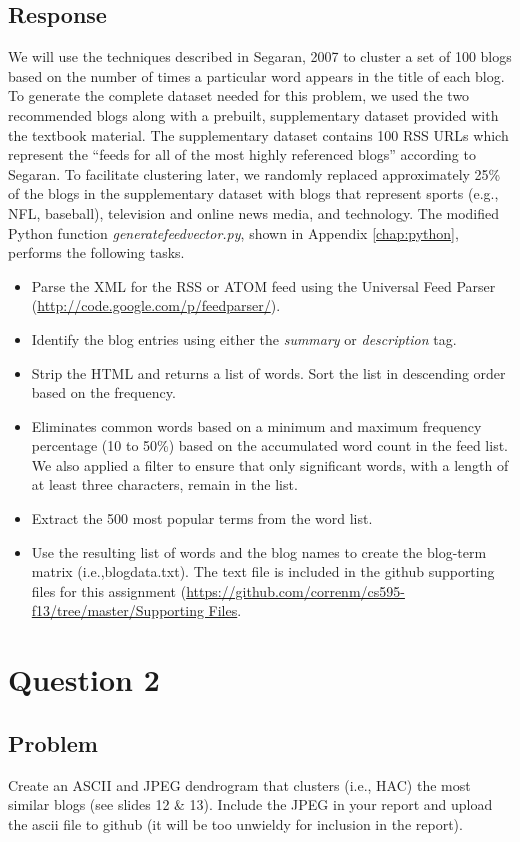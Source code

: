 \documentclass[letterpaper,11pt]{report}
\begin{document}
\begin{savenotes}
\subsection{Response}We will use the techniques described in Segaran, 2007 \cite{segaran2007programming} to cluster a set of 100 blogs based on the number of times a particular word appears in the title of each blog. To generate the complete dataset needed for this problem, we used the two recommended blogs along with a prebuilt, supplementary dataset provided with the textbook material. The supplementary dataset contains 100 RSS URLs which represent the ``feeds for all of the most highly referenced blogs'' according to Segaran. To facilitate clustering later, we randomly replaced approximately 25\% of the blogs in the supplementary dataset with blogs that represent sports (e.g., NFL, baseball), television and online news media, and technology. The modified Python function \emph{generatefeedvector.py}, shown in Appendix \ref{chap:python}, performs the following tasks.
\begin{itemize}
\item Parse the XML for the RSS or ATOM feed using the Universal Feed Parser (\url{http://code.google.com/p/feedparser/}).
\item Identify the blog entries using either the \emph{summary} or \emph{description} tag.
\item Strip the HTML and returns a list of words. Sort the list in descending order based on the frequency.
\item Eliminates common words based on a minimum and maximum frequency percentage (10 to 50\%) based on the accumulated word count in the feed list. We also applied a filter to ensure that only significant words, with a length of at least three characters, remain in the list.
\item Extract the 500 most popular terms from the word list.
\item Use the resulting list of words and the blog names to create the blog-term matrix (i.e.,blogdata.txt). The text file is included in the github supporting files for this assignment (\url{https://github.com/correnm/cs595-f13/tree/master/Supporting Files}.
\end{itemize}

\section{Question 2}
\subsection{Problem}Create an ASCII and JPEG dendrogram that clusters (i.e., HAC) the most similar blogs (see slides 12 \& 13).  Include the JPEG in your report and upload the ascii file to github (it will be too unwieldy for inclusion in the report).


\end{savenotes}
\end{document}
